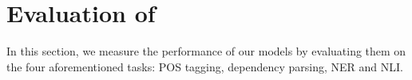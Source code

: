 
\section{Evaluation of \camembert}


In this section, we measure the performance of our models by evaluating them on the four aforementioned tasks: POS tagging, dependency parsing, NER and NLI.







